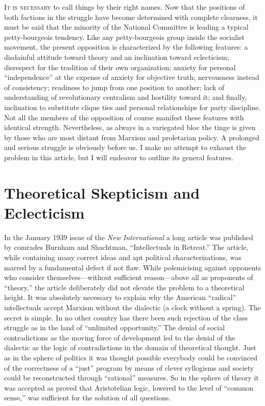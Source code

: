 \label{1939-12-15_a-petty-bourgeois-opposition-in-the-socialist-workers-party}

\noindent
\textsc{It is necessary} to call things by their right names. Now that the positions of both factions in the struggle have become determined with complete clearness, it must be said that the minority of the National Committee is leading a typical petty-bourgeois tendency. Like any petty-bourgeois group inside the socialist movement, the present opposition is characterized by the following features: a disdainful attitude toward theory and an inclination toward eclecticism; disrespect for the tradition of their own organization; anxiety for personal “independence” at the expense of anxiety for objective truth; nervousness instead of consistency; readiness to jump from one position to another; lack of understanding of revolutionary centralism and hostility toward it; and finally, inclination to substitute clique ties and personal relationships for party discipline. Not all the members of the opposition of course manifest these features with identical strength. Nevertheless, as always in a variegated bloc the tinge is given by those who are most distant from Marxism and proletarian policy. A prolonged and serious struggle is obviously before us. I make no attempt to exhaust the problem in this article, but I will endeavor to outline its general features.

\section*{Theoretical Skepticism and Eclecticism}

In the January 1939 issue of the \emph{New International} a long article was published by comrades Burnham and Shachtman, ``Intellectuals in Retreat.'' The article, while containing many correct ideas and apt political characterizations, was marred by a fundamental defect if not flaw. While polemicising against opponents who consider themselves---without sufficient reason---above all as proponents of “theory,” the article deliberately did not elevate the problem to a theoretical height. It was absolutely necessary to explain why the American “radical” intellectuals accept Marxism without the dialectic (a clock without a spring). The secret is simple. In no other country has there been such rejection of the class struggle as in the land of “unlimited opportunity.” The denial of social contradictions as the moving force of development led to the denial of the dialectic as the logic of contradictions in the domain of theoretical thought. Just as in the sphere of politics it was thought possible everybody could be convinced of the correctness of a “just” program by means of clever syllogisms and society could be reconstructed through “rational” measures. So in the sphere of theory it was accepted as proved that Aristotelian logic, lowered to the level of ``common sense,'' was sufficient for the solution of all questions.

